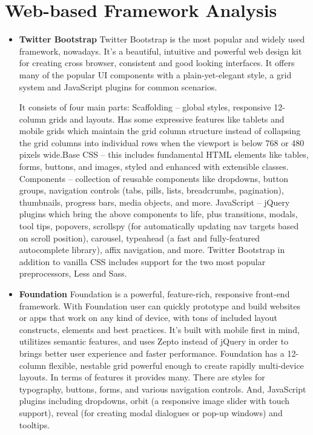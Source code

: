 \section{Web-based Framework Analysis}
 \begin{itemize}
	\item \textbf{Twitter Bootstrap}
	\newline
	Twitter Bootstrap is the most popular and widely used framework, nowadays. It’s a beautiful, intuitive and powerful web design kit for creating cross browser, consistent and good looking interfaces. It offers many of the popular UI components with a plain-yet-elegant style, a grid system and JavaScript plugins for common scenarios.

	It consists of four main parts:
	Scaffolding – global styles, responsive 12-column grids and layouts. Has some expressive features like tablets and mobile grids which maintain the grid column structure instead of collapsing the grid columns into individual rows when the viewport is below 768 or 480 pixels wide.Base CSS – this includes fundamental HTML elements like tables, forms, buttons, and images, styled and enhanced with extensible classes. Components – collection of reusable components like dropdowns, button groups, navigation controls (tabs, pills, lists, breadcrumbs, pagination), thumbnails, progress bars, media objects, and more. JavaScript – jQuery plugins which bring the above components to life, plus transitions, modals, tool tips, popovers, scrollspy (for automatically updating nav targets based on scroll position), carousel, typeahead (a fast and fully-featured autocomplete library), affix navigation, and more. Twitter Bootstrap in addition to vanilla CSS includes support for the two most popular preprocessors, Less and Sass.
	
	\item \textbf{Foundation}
	\newline
	Foundation is a powerful, feature-rich, responsive front-end framework. With Foundation user can quickly prototype and build websites or apps that work on any kind of device, with tons of included layout constructs, elements and best practices. It’s built with mobile first in mind, utilitizes semantic features, and uses Zepto instead of jQuery in order to brings better user experience and faster performance.
	\newline
	Foundation has a 12-column flexible, nestable grid powerful enough to create rapidly multi-device layouts. In terms of features it provides many. There are styles for typography, buttons, forms, and various navigation controls. And,  JavaScript plugins including dropdowns, orbit (a responsive image slider with touch support), reveal (for creating modal dialogues or pop-up windows) and tooltips.
	

\end{itemize}
